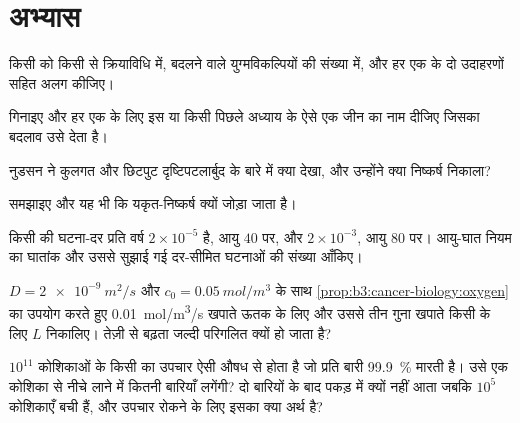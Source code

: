 \section{अभ्यास}

\begin{exercise}[$\star$]\label{exo:b3:cancer-biology:1}
किसी  को किसी  से क्रियाविधि में, बदलने वाले
युग्मविकल्पियों की संख्या में, और हर एक के दो उदाहरणों सहित अलग कीजिए।
\end{exercise}

\begin{exercise}[$\star$]\label{exo:b3:cancer-biology:2}
 गिनाइए और हर एक के लिए इस या किसी पिछले अध्याय के ऐसे
एक जीन का नाम दीजिए जिसका बदलाव उसे देता है।
\end{exercise}

\begin{exercise}[$\star$]\label{exo:b3:cancer-biology:3}
नुडसन ने कुलगत और छिटपुट दृष्टिपटलार्बुद के बारे में क्या देखा, और
उन्होंने क्या निष्कर्ष निकाला?
\end{exercise}

\begin{exercise}[$\star$]\label{exo:b3:cancer-biology:4}
 समझाइए और यह भी कि यकृत-निष्कर्ष क्यों जोड़ा जाता है।
\end{exercise}

\begin{exercise}[$\star\star$]\label{exo:b3:cancer-biology:5}
किसी  की घटना-दर प्रति वर्ष $2\times 10^{-5}$ है, आयु $40$ पर,
और $2\times 10^{-3}$, आयु $80$ पर। आयु-घात नियम का घातांक और उससे
सुझाई गई दर-सीमित घटनाओं की संख्या आँकिए।
\end{exercise}

\begin{exercise}[$\star\star$]\label{exo:b3:cancer-biology:6}
$D =
\qty{2e-9}{m^2/s}$ और $c_{0} = \qty{0.05}{mol/m^3}$ के साथ
\cref{prop:b3:cancer-biology:oxygen} का उपयोग करते हुए
\qty{0.01}{mol/m^3/s} खपाते ऊतक के लिए और उससे तीन गुना खपाते किसी
 के लिए $L$ निकालिए। तेज़ी से बढ़ता  जल्दी परिगलित क्यों हो
जाता है?
\end{exercise}

\begin{exercise}[$\star\star$]\label{exo:b3:cancer-biology:7}
$10^{11}$ कोशिकाओं के किसी  का उपचार ऐसी औषध से होता है जो प्रति
बारी \qty{99.9}{\%} मारती है। उसे एक कोशिका से नीचे लाने में कितनी
बारियाँ लगेंगी? दो बारियों के बाद  पकड़ में क्यों नहीं आता जबकि
$10^{5}$ कोशिकाएँ बची हैं, और उपचार रोकने के लिए इसका क्या अर्थ है?
\end{exercise}

